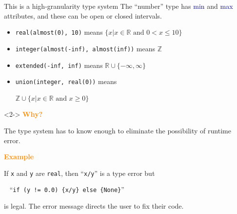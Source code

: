 \documentclass{beamer}
\begin{document}
\begin{frame}[fragile]{This is a high-granularity type system}
\vspace{0.5 cm}
The ``number'' type has \textcolor{darkblue}{min} and \textcolor{darkblue}{max} attributes, and these can be open or closed intervals.
\begin{itemize}
\item {\tt real(almost(0), 10)} means $\{x | x \in \mathbb{R}\mbox{ and } 0 < x \le 10\}$
\item {\tt integer(almost(-inf), almost(inf))} means $\mathbb{Z}$
\item {\tt extended(-inf, inf)} means $\mathbb{R} \cup \{-\infty, \infty\}$
\item {\tt union(integer, real(0))} means

\hfill $\mathbb{Z} \cup \{x | x \in \mathbb{R}\mbox{ and } x \ge 0\}$
\end{itemize}

\vfill
\begin{uncoverenv}<2->
\textcolor{darkorange}{\bf Why?}

The type system has to know enough to eliminate the possibility of runtime error.

\vspace{0.2 cm}
\textcolor{darkorange}{\bf Example}

If {\tt x} and {\tt y} are {\tt real}, then ``{\tt x/y}'' is a type error but

\vspace{0.2 cm}
\mbox{ } \hfill ``{\tt if (y != 0.0) \{x/y\} else \{None\}}'' \hfill \mbox{ }

\vspace{0.2 cm}
is legal. The error message directs the user to fix their code.
\end{uncoverenv}
\end{frame}
\end{document}
